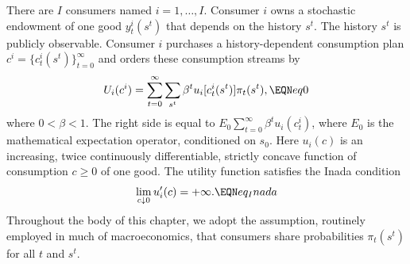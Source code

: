 There are $I$ consumers named $i=1, \ldots , I$. Consumer $i$
owns a stochastic endowment of one good
$y_t^i(s^t)$ that depends on the
history $s^t$.
The history $s^t$ is publicly observable.
Consumer $i$
purchases a history-dependent  consumption plan $c^i =
 \{c_t^i(s^t)\}_{t=0}^\infty$ and
orders these
consumption streams by
%
%
$$ U_i(c^i) =
   \sum_{t=0}^\infty \sum_{s^t} \beta^t u_i[c_t^i(s^t)]
   \pi_t(s^t),
 \EQN eq0 $$
 where $0 < \beta < 1$.
The right side is equal to $ E_0 \sum_{t=0}^\infty \beta^t
u_i(c_t^i) $, where $E_0$ is the mathematical expectation operator,
conditioned on $s_0$. Here $u_i(c)$ is an increasing, twice
continuously differentiable, strictly concave function of
consumption $c\geq 0$  of one good. The utility function satisfies
the Inada condition
$$ \lim_{c \downarrow 0} u'_i(c) = +\infty.  \EQN eq_Inada $$
Throughout the body  of this chapter, we adopt the assumption, routinely
employed in much of macroeconomics,
that  consumers share   probabilities $\pi_t(s^t)$ for all $t$ and $s^t$.

